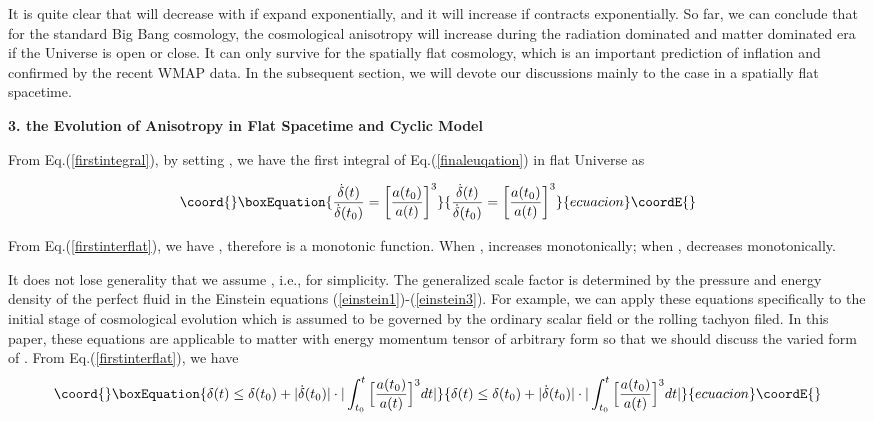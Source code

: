 \documentclass[a4paper,preprint]{revtex4}
\begin{document}
It is quite clear that \coordHE{} will decrease with \coordHE{} if
\coordHE{} expand exponentially, and it will increase if \coordHE{}
contracts exponentially. So far, we can conclude that for the
standard Big Bang cosmology, the cosmological anisotropy will
increase during the radiation dominated and matter dominated era
if the Universe is open or close. It can only survive for the
spatially flat cosmology, which is an important prediction of
inflation and confirmed by the recent WMAP data. In the subsequent
section, we will devote our discussions mainly to the case in a
spatially flat spacetime.

\vspace{0.4cm} \noindent\textbf{3. the Evolution of Anisotropy in
Flat Spacetime and Cyclic Model }
 \vspace{0.4cm}

From Eq.(\ref{firstintegral}), by setting \coordHE{}, we have the first
integral of Eq.(\ref{finaleuqation}) in flat Universe as

\begin{equation}\coord{}\boxEquation{\label{firstinterflat}
\frac{\dot{\delta}(t)}{\dot{\delta}(t_0)}=
\bigg[\frac{a(t_0)}{a(t)}\bigg]^3
}{\frac{\dot{\delta}(t)}{\dot{\delta}(t_0)}=
\bigg[\frac{a(t_0)}{a(t)}\bigg]^3
}{ecuacion}\coordE{}\end{equation}

\noindent From Eq.(\ref{firstinterflat}), we have
\coordHE{}, therefore
\coordHE{} is a monotonic function. When \coordHE{},
\coordHE{} increases monotonically; when \coordHE{},
\coordHE{} decreases monotonically.


It does not lose generality that we assume \coordHE{}, i.e.,
\coordHE{} for simplicity. The generalized scale factor
\coordHE{} is determined by the pressure and energy density of the
perfect fluid in the Einstein equations
(\ref{einstein1})-(\ref{einstein3}). For example, we can apply
these equations specifically to the initial stage of cosmological
evolution which  is assumed to be governed by the ordinary scalar
field or the rolling tachyon filed. In this paper, these equations
are applicable to matter with energy momentum tensor of arbitrary
form so that we should discuss the varied form of \coordHE{}. From
Eq.(\ref{firstinterflat}), we have
\begin{equation}\coord{}\boxEquation{\label{delta}
 \delta(t)\leq\delta(t_0)+|\dot{\delta}(t_0)|\cdot |\int_{t_0}^{t}\Big[\frac{a(t_0)}
 {a(t)}\Big]^3dt|
}{\delta(t)\leq\delta(t_0)+|\dot{\delta}(t_0)|\cdot |\int_{t_0}^{t}\Big[\frac{a(t_0)}
 {a(t)}\Big]^3dt|
}{ecuacion}\coordE{}\end{equation}
\end{document}
